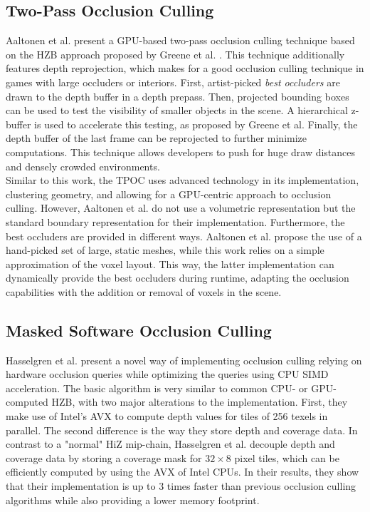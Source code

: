 \subsection*{Two-Pass Occlusion Culling}

Aaltonen et al. \cite{Aaltonen2015} present a \ac{GPU}-based two-pass occlusion culling technique based on 
the \ac{HZB} approach proposed by Greene et al. \cite{Greene93,Greene95}. This technique additionally features 
depth reprojection, which makes for a good occlusion culling technique in games with large occluders or interiors. 
First, artist-picked \emph{best occluders} are drawn to the depth buffer in a depth prepass. Then, projected 
bounding boxes can be used to test the visibility of smaller objects in the scene. A hierarchical z-buffer is 
used to accelerate this testing, as proposed by Greene et al. Finally, the depth buffer of the last frame can 
be reprojected to further minimize computations. This technique allows developers to push for huge draw distances 
and densely crowded environments. \\

\noindent
Similar to this work, the \ac{TPOC} uses advanced technology in its implementation, clustering geometry, and allowing 
for a \ac{GPU}-centric approach to occlusion culling. However, Aaltonen et al. do not use a volumetric representation 
but the standard boundary representation for their implementation. Furthermore, the best occluders are provided in different 
ways. Aaltonen et al. \cite{Aaltonen2015} propose the use of a hand-picked set of large, static meshes, while this 
work relies on a simple approximation of the voxel layout. This way, the latter implementation can dynamically 
provide the best occluders during runtime, adapting the occlusion capabilities with the addition or removal of 
voxels in the scene.


\subsection*{Masked Software Occlusion Culling}

Hasselgren et al. \cite{Hasselgren2016} present a novel way of implementing occlusion culling relying on hardware 
occlusion queries while optimizing the queries using \ac{CPU} \ac{SIMD} acceleration. The basic algorithm is very 
similar to common \ac{CPU}- or \ac{GPU}-computed \ac{HZB}, with two major alterations to the implementation. First, 
they make use of Intel's \ac{AVX} to compute depth values for tiles of 256 texels in parallel. The second difference 
is the way they store depth and coverage data. In contrast to a "normal" \ac{HiZ} mip-chain, Hasselgren et al. 
decouple depth and coverage data by storing a coverage mask for \begin{math}32 \times 8\end{math} pixel tiles, 
which can be efficiently computed by using the \ac{AVX} of Intel \ac{CPU}s. In their results, they show that their 
implementation is up to 3 times faster than previous occlusion culling algorithms while also providing a lower 
memory footprint. \\

